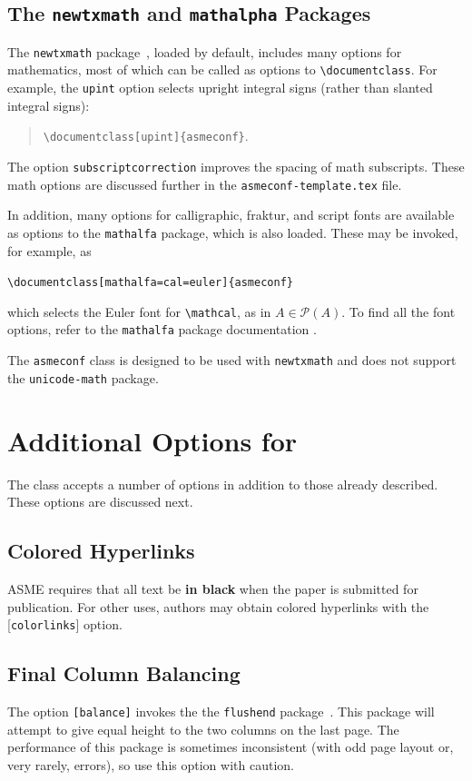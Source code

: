 \documentclass[grid,balance,upint,subscriptcorrection,varvw,mathalfa=cal=euler,spanish,french,greek,russian,vietnamese,colorlinks]{asmeconf}
\begin{document}
\subsection{The \texttt{newtxmath} and \texttt{mathalpha} Packages~\cite{sharpe1,sharpe2}} The \texttt{newtxmath} package~\cite{sharpe1}, loaded by default, includes many options for mathematics, most of which can be called as options to \verb|\documentclass|. For example, the \texttt{upint} option selects upright integral signs (rather than slanted integral signs):
\begin{quote}
\verb|\documentclass[upint]{asmeconf}|. 
\end{quote}  
The option \verb|subscriptcorrection| improves the spacing of math subscripts. These math options are discussed further in the \texttt{asmeconf-template.tex} file. 

In addition, many options for calligraphic, fraktur, and script fonts are available as options to the \texttt{mathalfa} package, which is also loaded. These may be invoked, for example, as 
\begin{center}
\verb|\documentclass[mathalfa=cal=euler]{asmeconf}| 
\end{center}
which selects the Euler font for \verb|\mathcal|, as in $A \in \mathcal{P}(A)$. To find all the font options, refer to the \texttt{mathalfa} package documentation \cite{sharpe2}.

The \texttt{asmeconf} class is designed to be used with \texttt{newtxmath} and does not support the \texttt{unicode-math} package.



\section{Additional Options for }
The class accepts a number of options in addition to those already described. These options are discussed next.

\subsection{Colored Hyperlinks}
ASME requires that all text be \textbf{in black} when the paper is submitted for publication.  For other uses, authors may
obtain colored hyperlinks with the [\texttt{colorlinks}] option.

\subsection{Final Column Balancing} The option \texttt{[balance]} invokes the the \texttt{flushend} package~\cite{tolusis}.
This package will attempt to give equal height to the two columns on the last page. The performance of this package is sometimes inconsistent (with odd page layout or, very rarely, errors), so use this option with caution.
\end{document}
